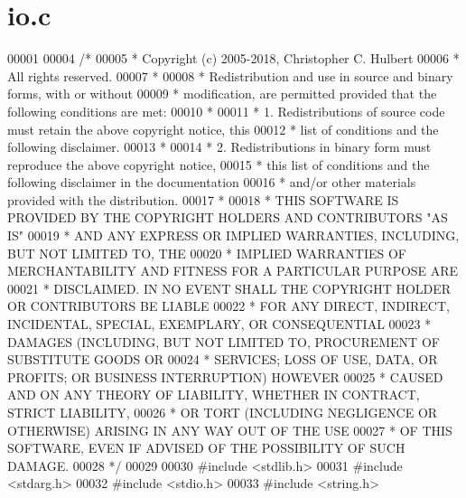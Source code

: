\hypertarget{io_8c_source}{}\section{io.\+c}
\label{io_8c_source}

\begin{DoxyCode}
00001 
00004 \textcolor{comment}{/*}
00005 \textcolor{comment}{ * Copyright (c) 2005-2018, Christopher C. Hulbert}
00006 \textcolor{comment}{ * All rights reserved.}
00007 \textcolor{comment}{ *}
00008 \textcolor{comment}{ * Redistribution and use in source and binary forms, with or without}
00009 \textcolor{comment}{ * modification, are permitted provided that the following conditions are met:}
00010 \textcolor{comment}{ *}
00011 \textcolor{comment}{ * 1. Redistributions of source code must retain the above copyright notice, this}
00012 \textcolor{comment}{ *    list of conditions and the following disclaimer.}
00013 \textcolor{comment}{ *}
00014 \textcolor{comment}{ * 2. Redistributions in binary form must reproduce the above copyright notice,}
00015 \textcolor{comment}{ *    this list of conditions and the following disclaimer in the documentation}
00016 \textcolor{comment}{ *    and/or other materials provided with the distribution.}
00017 \textcolor{comment}{ *}
00018 \textcolor{comment}{ * THIS SOFTWARE IS PROVIDED BY THE COPYRIGHT HOLDERS AND CONTRIBUTORS "AS IS"}
00019 \textcolor{comment}{ * AND ANY EXPRESS OR IMPLIED WARRANTIES, INCLUDING, BUT NOT LIMITED TO, THE}
00020 \textcolor{comment}{ * IMPLIED WARRANTIES OF MERCHANTABILITY AND FITNESS FOR A PARTICULAR PURPOSE ARE}
00021 \textcolor{comment}{ * DISCLAIMED. IN NO EVENT SHALL THE COPYRIGHT HOLDER OR CONTRIBUTORS BE LIABLE}
00022 \textcolor{comment}{ * FOR ANY DIRECT, INDIRECT, INCIDENTAL, SPECIAL, EXEMPLARY, OR CONSEQUENTIAL}
00023 \textcolor{comment}{ * DAMAGES (INCLUDING, BUT NOT LIMITED TO, PROCUREMENT OF SUBSTITUTE GOODS OR}
00024 \textcolor{comment}{ * SERVICES; LOSS OF USE, DATA, OR PROFITS; OR BUSINESS INTERRUPTION) HOWEVER}
00025 \textcolor{comment}{ * CAUSED AND ON ANY THEORY OF LIABILITY, WHETHER IN CONTRACT, STRICT LIABILITY,}
00026 \textcolor{comment}{ * OR TORT (INCLUDING NEGLIGENCE OR OTHERWISE) ARISING IN ANY WAY OUT OF THE USE}
00027 \textcolor{comment}{ * OF THIS SOFTWARE, EVEN IF ADVISED OF THE POSSIBILITY OF SUCH DAMAGE.}
00028 \textcolor{comment}{ */}
00029 
00030 \textcolor{preprocessor}{#include <stdlib.h>}
00031 \textcolor{preprocessor}{#include <stdarg.h>}
00032 \textcolor{preprocessor}{#include <stdio.h>}
00033 \textcolor{preprocessor}{#include <string.h>}

\end{DoxyCode}
